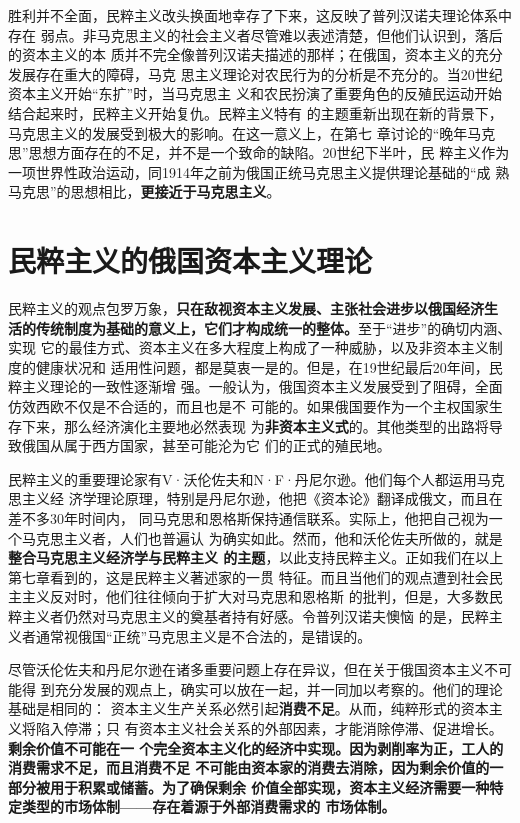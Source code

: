 胜利并不全面，民粹主义改头换面地幸存了下来，这反映了普列汉诺夫理论体系中存在
弱点。非马克思主义的社会主义者尽管难以表述清楚，但他们认识到，落后的资本主义的本
质并不完全像普列汉诺夫描述的那样；在俄国，资本主义的充分发展存在重大的障碍，马克
思主义理论对农民行为的分析是不充分的。当20世纪资本主义开始“东扩”时，当马克思主
义和农民扮演了重要角色的反殖民运动开始结合起来时，民粹主义开始复仇。民粹主义特有
的主题重新出现在新的背景下，马克思主义的发展受到极大的影响。在这一意义上，在第七
章讨论的“晚年马克思”思想方面存在的不足，并不是一个致命的缺陷。20世纪下半叶，民
粹主义作为一项世界性政治运动，同1914年之前为俄国正统马克思主义提供理论基础的“成
熟马克思”的思想相比，\textbf{更接近于马克思主义}。

\section{民粹主义的俄国资本主义理论}
民粹主义的观点包罗万象，\textbf{只在敌视资本主义发展、主张社会进步以俄国经济生
  活的传统制度为基础的意义上，它们才构成统一的整体。}至于“进步”的确切内涵、实现
它的最佳方式、资本主义在多大程度上构成了一种威胁，以及非资本主义制度的健康状况和
适用性问题，都是莫衷一是的。但是，在19世纪最后20年间，民粹主义理论的一致性逐渐增
强。一般认为，俄国资本主义发展受到了阻碍，全面仿效西欧不仅是不合适的，而且也是不
可能的。如果俄国要作为一个主权国家生存下来，那么经济演化主要地必然表现
为\textbf{非资本主义式}的。其他类型的出路将导致俄国从属于西方国家，甚至可能沦为它
们的正式的殖民地。

民粹主义的重要理论家有V·沃伦佐夫和N·F·丹尼尔逊。他们每个人都运用马克思主义经
济学理论原理，特别是丹尼尔逊，他把《资本论》翻译成俄文，而且在差不多30年时间内，
同马克思和恩格斯保持通信联系。实际上，他把自己视为一个马克思主义者，人们也普遍认
为确实如此。然而，他和沃伦佐夫所做的，就是\textbf{整合马克思主义经济学与民粹主义
  的主题}，以此支持民粹主义。正如我们在以上第七章看到的，这是民粹主义著述家的一贯
特征。而且当他们的观点遭到社会民主主义反对时，他们往往倾向于扩大对马克思和恩格斯
的批判，但是，大多数民粹主义者仍然对马克思主义的奠基者持有好感。令普列汉诺夫懊恼
的是，民粹主义者通常视俄国“正统”马克思主义是不合法的，是错误的。

尽管沃伦佐夫和丹尼尔逊在诸多重要问题上存在异议，但在关于俄国资本主义不可能得
到充分发展的观点上，确实可以放在一起，并一同加以考察的。他们的理论基础是相同的：
资本主义生产关系必然引起\textbf{消费不足}。从而，纯粹形式的资本主义将陷入停滞；只
有资本主义社会关系的外部因素，才能消除停滞、促进增长。\textbf{剩余价值不可能在一
  个完全资本主义化的经济中实现。因为剥削率为正，工人的消费需求不足，而且消费不足
  不可能由资本家的消费去消除，因为剩余价值的一部分被用于积累或储蓄。为了确保剩余
  价值全部实现，资本主义经济需要一种特定类型的市场体制——存在着源于外部消费需求的
  市场体制。}

